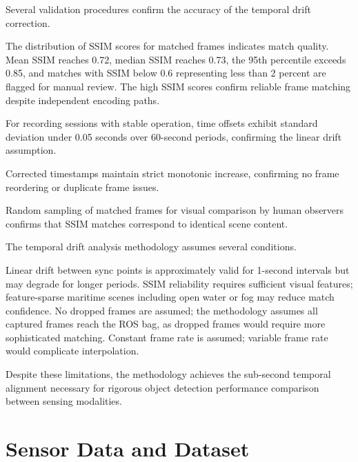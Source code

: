 \documentclass{erauthesis}
\begin{document}

Several validation procedures confirm the accuracy of the temporal drift correction.


The distribution of SSIM scores for matched frames indicates match quality.
Mean SSIM reaches 0.72, median SSIM reaches 0.73, the 95th percentile exceeds 0.85, and matches with SSIM below 0.6 representing less than 2 percent are flagged for manual review.
The high SSIM scores confirm reliable frame matching despite independent encoding paths.


For recording sessions with stable operation, time offsets exhibit standard deviation under 0.05 seconds over 60-second periods, confirming the linear drift assumption.


Corrected timestamps maintain strict monotonic increase, confirming no frame reordering or duplicate frame issues.


Random sampling of matched frames for visual comparison by human observers confirms that SSIM matches correspond to identical scene content.


The temporal drift analysis methodology assumes several conditions.

Linear drift between sync points is approximately valid for 1-second intervals but may degrade for longer periods.
SSIM reliability requires sufficient visual features; feature-sparse maritime scenes including open water or fog may reduce match confidence.
No dropped frames are assumed; the methodology assumes all captured frames reach the ROS bag, as dropped frames would require more sophisticated matching.
Constant frame rate is assumed; variable frame rate would complicate interpolation.

Despite these limitations, the methodology achieves the sub-second temporal alignment necessary for rigorous object detection performance comparison between sensing modalities.

\section{Sensor Data and Dataset}
\label{sec:sensor_data_dataset}
\end{document}
